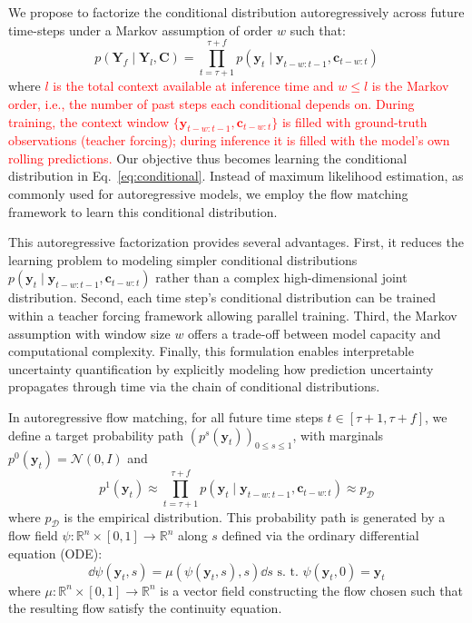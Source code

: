 \documentclass[a4paper,10pt,twocolumn,preprint,3p]{elsarticle}
\begin{document}
We propose to factorize the conditional distribution autoregressively across future time-steps under a Markov assumption of order $w$ such that:
\begin{equation}
p(\mathbf{Y}_f \mid \mathbf{Y}_l, \mathbf{C}) = \prod_{t=\tau+1}^{\tau+f} p(\mathbf{y}_{t} \mid \mathbf{y}_{t-w:t-1}, \mathbf{c}_{t-w:t})
\label{eq:conditional}
\end{equation}
where \textcolor{red}{$l$ is the total context available at inference time and $w \le l$ is the Markov order, i.e., the number of past steps each conditional depends on. During training, the context window $\{\mathbf{y}_{t-w:t-1}, \mathbf{c}_{t-w:t}\}$ is filled with ground-truth observations (teacher forcing); during inference it is filled with the model's own rolling predictions.}
Our objective thus becomes learning the conditional distribution in Eq.~\eqref{eq:conditional}. 
Instead of maximum likelihood estimation, as commonly used for autoregressive models, we employ the flow matching framework to learn this conditional distribution.


This autoregressive factorization provides several advantages. First, it reduces the learning problem to modeling simpler conditional distributions $p(\mathbf{y}_{t} \mid \mathbf{y}_{t-w:t-1}, \mathbf{c}_{t-w:t})$ rather than a complex high-dimensional joint distribution. Second, each time step's conditional distribution can be trained within a teacher forcing framework allowing parallel training. Third, the Markov assumption with window size $w$ offers a trade-off between model capacity and computational complexity. Finally, this formulation enables interpretable uncertainty quantification by explicitly modeling how prediction uncertainty propagates through time via the chain of conditional distributions. 


In autoregressive flow matching, for all future time steps $t \in [\tau+1, \tau+f]$, we define a target probability path $(p^s(\mathbf{y}_t))_{0\le s \le 1}$, with marginals $p^0(\mathbf{y}_t) = \mathcal{N}(0,I)$ and  $$p^1(\mathbf{y}_t) \approx \prod_{t=\tau+1}^{\tau+f}p(\mathbf{y}_{t} \mid \mathbf{y}_{t-w:t-1}, \mathbf{c}_{t-w:t}) \approx p_\mathcal{D}$$ where $p_\mathcal{D}$ is the empirical distribution. This probability path is generated by a flow field $\psi\colon \mathbb{R}^n \times [0,1] \to \mathbb{R}^n$ along $s$ defined via the ordinary differential equation (ODE):
\begin{equation}\label{eq:target_flow}
\dd \psi(\mathbf{y}_{t}, s) = \mu(\psi(\mathbf{y}_{t},s),s) \dd s \text{ s.~t. } \psi(\mathbf{y}_{t}, 0) = \mathbf{y}_{t}
\end{equation}
where $\mu \colon \mathbb{R}^n \times [0,1] \to \mathbb{R}^n$ is a vector field constructing the flow chosen such that the resulting flow satisfy the continuity equation.
\end{document}
